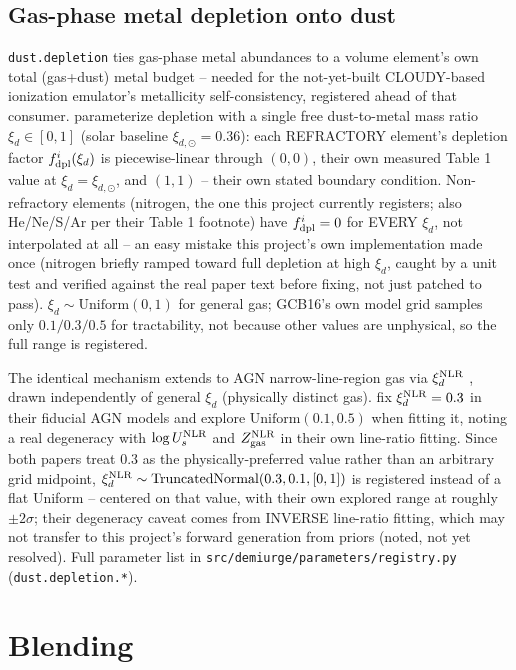 \documentclass{aastex7}
\begin{document}
\subsection{Gas-phase metal depletion onto dust}
\label{sec:depletion}

\texttt{dust.depletion} ties gas-phase metal abundances to a volume
element's own total (gas+dust) metal budget -- needed for the not-yet-built
CLOUDY-based ionization emulator's metallicity self-consistency, registered
ahead of that consumer. \citet{GutkinEtAl2016} parameterize depletion with a
single free dust-to-metal mass ratio $\xi_d \in [0, 1]$ (solar baseline
$\xi_{d,\odot}=0.36$): each REFRACTORY element's depletion factor
$f_{\rm dpl}^i(\xi_d)$ is piecewise-linear through $(0,0)$, their own
measured Table 1 value at $\xi_d=\xi_{d,\odot}$, and $(1,1)$ -- their own
stated boundary condition. Non-refractory elements (nitrogen, the one this
project currently registers; also He/Ne/S/Ar per their Table 1 footnote)
have $f_{\rm dpl}^i=0$ for EVERY $\xi_d$, not interpolated at all -- an
easy mistake this project's own implementation made once (nitrogen briefly
ramped toward full depletion at high $\xi_d$, caught by a unit test and
verified against the real paper text before fixing, not just patched to
pass). $\xi_d \sim \mathrm{Uniform}(0, 1)$ for general gas; GCB16's own
model grid samples only $0.1/0.3/0.5$ for tractability, not because other
values are unphysical, so the full range is registered.

The identical mechanism extends to AGN narrow-line-region gas via
$\xi_d^{\rm NLR}$ \citep[built on][own AGN-NLR CLOUDY grid]{FeltreEtAl2016},
drawn independently of general $\xi_d$ (physically distinct gas).
\citet{VidalGarciaEtAl2024} fix $\xi_d^{\rm NLR}=0.3$ in their fiducial AGN
models and explore $\mathrm{Uniform}(0.1, 0.5)$ when fitting it, noting a
real degeneracy with $\log U_s^{\rm NLR}$ and $Z_{\rm gas}^{\rm NLR}$ in
their own line-ratio fitting. Since both papers treat $0.3$ as the
physically-preferred value rather than an arbitrary grid midpoint,
$\xi_d^{\rm NLR} \sim \mathrm{TruncatedNormal}(0.3, 0.1, [0,1])$ is
registered instead of a flat Uniform -- centered on that value, with their
own explored range at roughly $\pm 2\sigma$; their degeneracy caveat comes
from INVERSE line-ratio fitting, which may not transfer to this project's
forward generation from priors (noted, not yet resolved). Full parameter
list in \texttt{src/demiurge/parameters/registry.py}
(\texttt{dust.depletion.*}).

\section{Blending}
\label{sec:blending}
\end{document}
